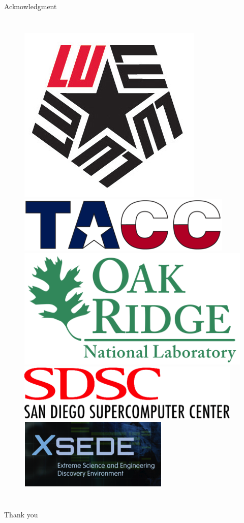 \documentclass{beamer}
\begin{document}
\begin{frame}{Acknowledgment}
\begin{columns}
	\begin{figure}
		\includegraphics[width=.5\columnwidth]{Pics/LU.jpg} \\
		\includegraphics[width=.8\columnwidth]{Pics/TACC.png} \\
		\includegraphics[width=.8\columnwidth]{Pics/ORNL.png} \\
		\includegraphics[width=.8\columnwidth]{Pics/SDSC.png} \\
		\includegraphics[width=.8\columnwidth]{Pics/XSEDE.png}
		
	\end{figure}
	
\end{columns}

\end{frame}

\begin{frame}
 \centering 
 {\Large Thank you}
\end{frame}
\end{document}
